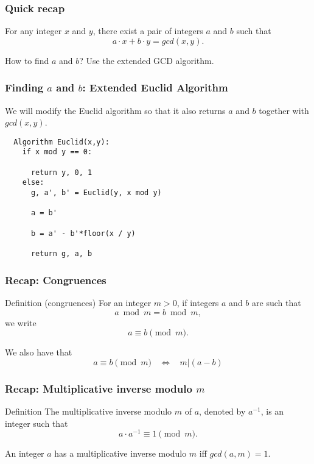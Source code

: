 

\begin{frame}
  \frametitle{Quick recap} 

  For any integer $x$ and $y$, there exist a pair of integers $a$ and
  $b$ such that \[ a\cdot x + b\cdot y = gcd(x,y).  \]

  \pause
  How to find $a$ and $b$?  Use the extended GCD algorithm.
\end{frame}

\begin{frame}[fragile]
  \frametitle{Finding $a$ and $b$: Extended Euclid Algorithm}

  We will modify the Euclid algorithm so that it also returns $a$ and
  $b$ together with $gcd(x,y)$.
  
  \begin{tcolorbox}
  {\small
\begin{verbatim}
  Algorithm Euclid(x,y):
    if x mod y == 0:

      return y, 0, 1
    else:
      g, a', b' = Euclid(y, x mod y)

      a = b'

      b = a' - b'*floor(x / y)     

      return g, a, b
\end{verbatim}
  }
  \end{tcolorbox}
  
\end{frame}

\begin{frame}
  \frametitle{Recap: Congruences}

  \begin{block}{Definition (congruences)}
    For an integer $m>0$,
    if integers $a$ and $b$ are such that
    \[
    a \bmod m = b \bmod m,
    \]
    we write
    \[
    a \equiv b \pmod m.
    \]
  \end{block}

  We also have that
  \[
  a \equiv b \pmod m \ \ \ \ \Leftrightarrow \ \ \ \
  m|(a-b)
  \]
\end{frame}

\begin{frame}
  \frametitle{Recap: Multiplicative inverse modulo $m$}

  \begin{block}{Definition}
    The multiplicative inverse modulo $m$ of $a$, denoted by $a^{-1}$,
    is an integer such that
    \[
    a\cdot a^{-1}\equiv 1 \pmod m.
    \]
  \end{block}
  \vspace{0.2in}
  \begin{theorem}
    An integer $a$ has a multiplicative inverse modulo $m$ iff
    $gcd(a,m) = 1$.
  \end{theorem}
\end{frame}


